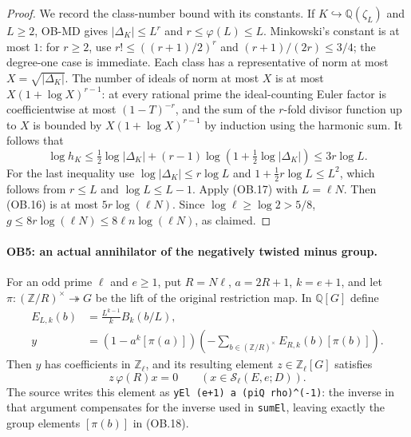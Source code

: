 \begin{proof}
We record the class-number bound with its constants.  If
$K\hookrightarrow\mathbb Q(\zeta_L)$ and $L\ge2$, OB-MD gives
$|\Delta_K|\le L^r$ and $r\le\varphi(L)\le L$.
Minkowski's constant is at most $1$: for $r\ge2$, use
$r!\le((r+1)/2)^r$ and $(r+1)/(2r)\le3/4$; the degree-one
case is immediate.  Each class has a representative of norm at
most $X=\sqrt{|\Delta_K|}$.
The number of ideals of norm at most $X$ is at most
$X(1+\log X)^{r-1}$: at every rational prime the ideal-counting
Euler factor is coefficientwise at most $(1-T)^{-r}$, and the
sum of the $r$-fold divisor function up to $X$ is bounded by
$X(1+\log X)^{r-1}$ by induction using the harmonic sum.
It follows that
\[
 \log h_K\le\tfrac12\log|\Delta_K|
       +(r-1)\log(1+\tfrac12\log|\Delta_K|)
                       \le3r\log L.                 \tag{OB.17}
\]
For the last inequality use $\log|\Delta_K|\le r\log L$ and
$1+\tfrac12r\log L\le L^2$, which follows from
$r\le L$ and $\log L\le L-1$.
Apply (OB.17) with $L=\ell N$.  Then (OB.16) is at most
$5r\log(\ell N)$.  Since $\log\ell\ge\log2>5/8$,
$g\le8r\log(\ell N)\le8\ell n\log(\ell N)$, as claimed.
\end{proof}

\paragraph{OB5: an actual annihilator of the negatively twisted minus group.}
\label{claim:OB5}
For an odd prime $\ell$ and $e\ge1$, put $R=N\ell$,
$a=2R+1$, $k=e+1$, and let
$\pi:(\mathbb Z/R)^\times\twoheadrightarrow G$
be the lift of the original restriction map.  In $\mathbb Q[G]$
define
\[
 \begin{split}
 E_{L,k}(b)&=\frac{L^{k-1}}{k}B_k(b/L),\\
 y&=(1-a^k[\pi(a)])
                  \left(-\sum_{b\in(\mathbb Z/R)^\times}
                                  E_{R,k}(b)[\pi(b)]\right).
 \end{split}                                                   \tag{OB.18}
\]
Then $y$ has coefficients in $\mathbb Z_\ell$, and its resulting
element $z\in\mathbb Z_\ell[G]$ satisfies
\[
                 z\,\varphi(R)x=0
                 \qquad(x\in\mathcal S_\ell(E,e;D)).
 \tag{OB.19}
\]
The source writes this element as
\texttt{yEl (e+1) a (piQ rho)\^{}(-1)}: the inverse in that
argument compensates for the inverse used in \texttt{sumEl},
leaving exactly the group elements $[\pi(b)]$ in (OB.18).

